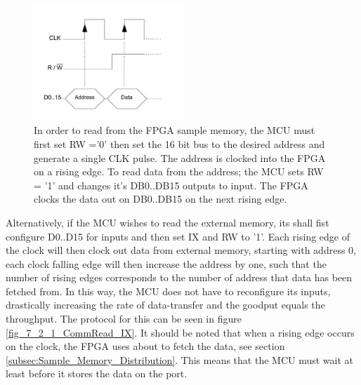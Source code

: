\begin{figure}[H]
    \centering
    \includegraphics[clip, trim=0 50 0 0, width=0.5\textwidth]{Sections/7_SystemDesign/Figures/7_2_1_CommRead.pdf}
    \caption{In order to read from the FPGA sample memory, the MCU must first set RW ='0' then set the 16 bit bus to the desired address and generate a single CLK pulse. The address is clocked into the FPGA on a rising edge. To read data from the address; the MCU sets RW = '1' and changes it's DB0..DB15 outputs to input. The FPGA clocks the data out on DB0..DB15 on the next rising edge.}
    \label{fig_7_2_1_CommRead}
\end{figure}

Alternatively, if the MCU wishes to read the external memory, its shall fist configure D0..D15 for inputs and then set IX and RW to '1'. Each rising edge of the clock will then clock out data from external memory, starting with address 0, each clock falling edge will then increase the address by one, such that the number of rising edges corresponds to the number of address that data has been fetched from. In this way, the MCU does not have to reconfigure its inputs, drastically increasing the rate of data-transfer and the goodput equals the throughput. The protocol for this can be seen in figure \ref{fig_7_2_1_CommRead_IX}. It should be noted that when a rising edge occurs on the clock, the FPGA uses about  to fetch the data, see section \ref{subsec:Sample_Memory_Distribution}. This means that the MCU must wait at least  before it stores the data on the port.

